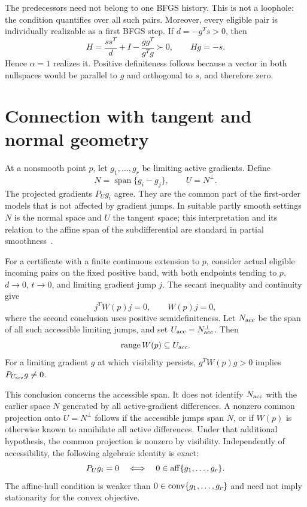 The predecessors need not belong to one BFGS history. This is not a loophole: the condition quantifies over all such pairs. Moreover, every eligible pair is individually realizable as a first BFGS step. If $d=-g^Ts>0$, then
\[
 H=\frac{ss^T}{d}+I-\frac{gg^T}{g^Tg}\succ0,\qquad Hg=-s.
\]
Hence $\alpha=1$ realizes it. Positive definiteness follows because a vector in both nullspaces would be parallel to $g$ and orthogonal to $s$, and therefore zero.


\setcounter{section}{3}
\setcounter{theorem}{0}
\setcounter{equation}{4}


\section{Connection with tangent and normal geometry}

At a nonsmooth point $p$, let $g_1,\dots,g_r$ be limiting active gradients. Define
\[
 N=\operatorname{span}\{g_i-g_j\},\qquad U=N^\perp.
\]
The projected gradients $P_Ug_i$ agree. They are the common part of the first-order models that is not affected by gradient jumps. In suitable partly smooth settings $N$ is the normal space and $U$ the tangent space; this interpretation and its relation to the affine span of the subdifferential are standard in partial smoothness~\cite{LL}.

For a certificate with a finite continuous extension to $p$, consider actual eligible incoming pairs on the fixed positive band, with both endpoints tending to $p$, $d\to0$, $t\to0$, and limiting gradient jump $j$. The secant inequality and continuity give
\[
 j^TW(p)j=0,\qquad W(p)j=0,
\]
where the second conclusion uses positive semidefiniteness. Let $N_{\rm acc}$ be the span of all such accessible limiting jumps, and set $U_{\rm acc}=N_{\rm acc}^{\perp}$. Then
\[
 \operatorname{range}W(p)\subseteq U_{\rm acc}.
\]
For a limiting gradient $g$ at which visibility persists, $g^TW(p)g>0$ implies $P_{U_{\rm acc}}g\ne0$.

This conclusion concerns the accessible span. It does not identify $N_{\rm acc}$ with the earlier space $N$ generated by all active-gradient differences. A nonzero common projection onto $U=N^\perp$ follows if the accessible jumps span $N$, or if $W(p)$ is otherwise known to annihilate all active differences. Under that additional hypothesis, the common projection is nonzero by visibility. Independently of accessibility, the following algebraic identity is exact:
\[
 P_Ug_i=0\quad\Longleftrightarrow\quad0\in\operatorname{aff}\{g_1,\dots,g_r\}.
\]
The affine-hull condition is weaker than $0\in\operatorname{conv}\{g_1,\dots,g_r\}$ and need not imply stationarity for the convex objective.

